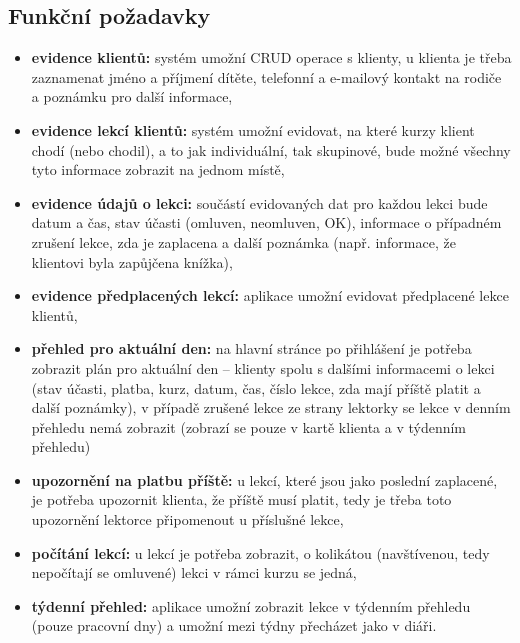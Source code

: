     \subsection{Funkční požadavky}
    \begin{itemize}
        \item \textbf{evidence klientů:} systém umožní CRUD operace s klienty, u klienta je třeba zaznamenat jméno a příjmení dítěte, telefonní a e-mailový kontakt na rodiče a poznámku pro další informace,
        \item \textbf{evidence lekcí klientů:} systém umožní evidovat, na které kurzy klient chodí (nebo chodil), a to jak individuální, tak skupinové, bude možné všechny tyto informace zobrazit na jednom místě,
        \item \textbf{evidence údajů o lekci:} součástí evidovaných dat pro každou lekci bude datum a čas, stav účasti (omluven, neomluven, OK), informace o případném zrušení lekce, zda je zaplacena a další poznámka (např. informace, že klientovi byla zapůjčena knížka),
        \item \textbf{evidence předplacených lekcí:} aplikace umožní evidovat předplacené lekce klientů,
        \item \textbf{přehled pro aktuální den:} na hlavní stránce po přihlášení je potřeba zobrazit plán pro aktuální den -- klienty spolu s dalšími informacemi o lekci (stav účasti, platba, kurz, datum, čas, číslo lekce, zda mají příště platit a další poznámky), v případě zrušené lekce ze strany lektorky se lekce v denním přehledu nemá zobrazit (zobrazí se pouze v kartě klienta a v týdenním přehledu)
        \item \textbf{upozornění na platbu příště:} u lekcí, které jsou jako poslední zaplacené, je potřeba upozornit klienta, že příště musí platit, tedy je třeba toto upozornění lektorce připomenout u příslušné lekce,
        \item \textbf{počítání lekcí:} u lekcí je potřeba zobrazit, o kolikátou (navštívenou, tedy nepočítají se omluvené) lekci v rámci kurzu se jedná,
        \item \textbf{týdenní přehled:} aplikace umožní zobrazit lekce v týdenním přehledu (pouze pracovní dny) a umožní mezi týdny přecházet jako v diáři.
    \end{itemize}
    
